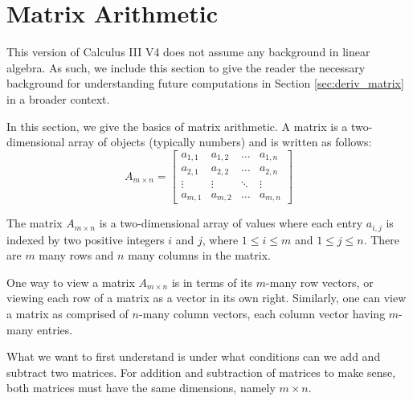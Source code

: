 \section{Matrix Arithmetic}\label{sec:matrix_arithmetic}

This version of \apex Calculus III V4 does not assume any background in linear algebra.  As such, we include this section to give the reader the necessary background for understanding future computations in Section \ref{sec:deriv_matrix} in a broader context.  

\bigskip

In this section, we give the basics of matrix arithmetic.  A matrix is a two-dimensional array of objects (typically numbers) and is written as follows:
\[
A_{m \times n} = 
\begin{bmatrix}
a_{1,1} & a_{1,2} & \dots & a_{1,n}\\
a_{2,1} & a_{2,2} &\dots & a_{2,n}\\
\vdots & \vdots &\ddots&  \vdots \\
a_{m,1} & a_{m,2}  & \dots  & a_{m,n}
\end{bmatrix}
\]


The matrix $A_{m\times n}$ is a two-dimensional array of values where each entry $a_{i,j}$ is indexed by two positive integers $i$ and $j$, where $1\leq i\leq m$ and $1\leq j \leq n$.  There are $m$ many rows and $n$ many columns in the matrix.  

One way to view a matrix $A_{m\times n}$ is in terms of its $m$-many row vectors, or viewing each row of a matrix as a vector in its own right.  Similarly, one can view a matrix as comprised of $n$-many column vectors, each column vector having $m$-many entries. 
\bigskip

What we want to first understand is under what conditions can we add and subtract two matrices.  For addition and subtraction of matrices to make sense, both matrices must have the same dimensions, namely $m\times n$. \\ 

